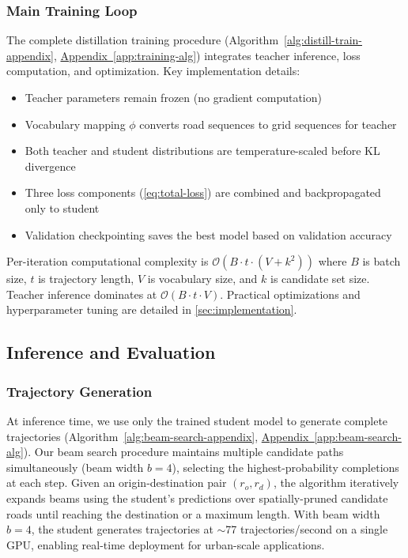 \subsubsection{Main Training Loop}
The complete distillation training procedure (Algorithm~\ref{alg:distill-train-appendix}, \hyperref[app:training-alg]{Appendix~\ref*{app:training-alg}}) integrates teacher inference, loss computation, and optimization. Key implementation details:

\begin{itemize}[noitemsep,topsep=0pt]
\item Teacher parameters remain frozen (no gradient computation)
\item Vocabulary mapping $\phi$ converts road sequences to grid sequences for teacher
\item Both teacher and student distributions are temperature-scaled before KL divergence
\item Three loss components (\autoref{eq:total-loss}) are combined and backpropagated only to student
\item Validation checkpointing saves the best model based on validation accuracy
\end{itemize}

Per-iteration computational complexity is $\mathcal{O}(B \cdot t \cdot (V + k^2))$ where $B$ is batch size, $t$ is trajectory length, $V$ is vocabulary size, and $k$ is candidate set size. Teacher inference dominates at $\mathcal{O}(B \cdot t \cdot V)$. Practical optimizations and hyperparameter tuning are detailed in \autoref{sec:implementation}.

\subsection{Inference and Evaluation}
\label{sec:method-inference}

\subsubsection{Trajectory Generation}
At inference time, we use only the trained student model to generate complete trajectories (Algorithm~\ref{alg:beam-search-appendix}, \hyperref[app:beam-search-alg]{Appendix~\ref*{app:beam-search-alg}}). Our beam search procedure maintains multiple candidate paths simultaneously (beam width $b=4$), selecting the highest-probability completions at each step. Given an origin-destination pair $(r_o, r_d)$, the algorithm iteratively expands beams using the student's predictions over spatially-pruned candidate roads until reaching the destination or a maximum length. With beam width $b=4$, the student generates trajectories at $\sim$77 trajectories/second on a single GPU, enabling real-time deployment for urban-scale applications.

